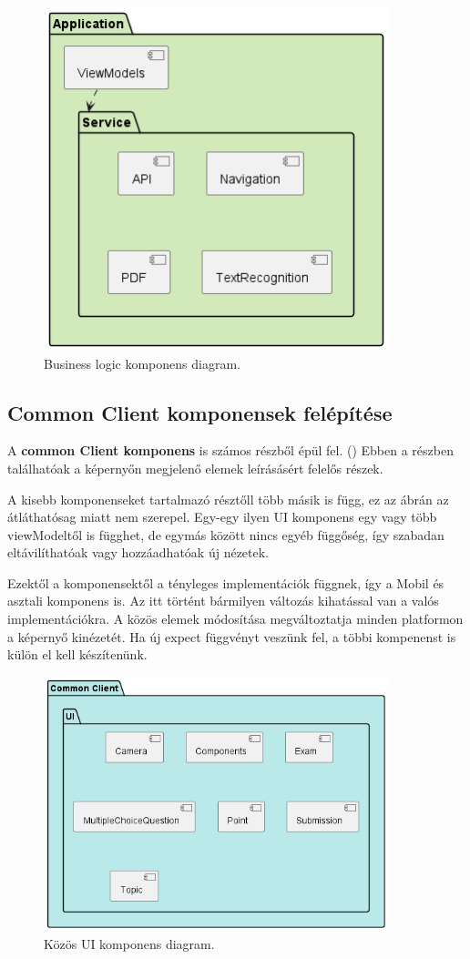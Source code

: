 \begin{figure}[!ht]
    \centering
    \includegraphics[width=100mm, keepaspectratio]{figures/Business Component.png}
    \caption{Business logic komponens diagram.}
    \label{fig:BusinessComponentDiagram}
\end{figure}

\subsection{Common Client komponensek felépítése}

A \textbf{common Client komponens} is számos részből épül fel. ()
Ebben a részben találhatóak a képernyőn megjelenő elemek leírásásért felelős részek.

A kisebb komponenseket tartalmazó résztőll több másik is függ, ez az ábrán az átláthatósag miatt nem szerepel.
Egy-egy ilyen UI komponens egy vagy több viewModeltől is függhet, de egymás között nincs egyéb függőség, így szabadan eltávilíthatóak vagy hozzáadhatóak új nézetek.

Ezektől a komponensektől a tényleges implementációk függnek, így a Mobil és asztali komponens is.
Az itt történt bármilyen változás kihatással van a valós implementációkra.
A közös elemek módosítása megváltoztatja minden platformon a képernyő kinézetét.
Ha új expect függvényt veszünk fel, a többi kompenenst is külön el kell készítenünk.


\begin{figure}[!ht]
    \centering
    \includegraphics[width=100mm, keepaspectratio]{figures/Common Component.png}
    \caption{Közös UI komponens diagram.}
    \label{fig:CommonComponentDiagram}
\end{figure}